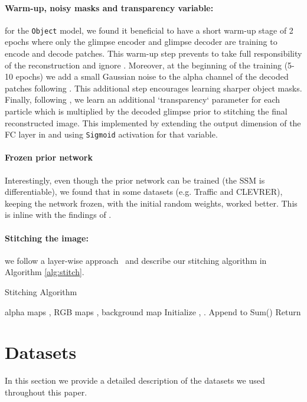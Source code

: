 \documentclass[nohyperref]{article}
\theoremstyle{plain}
\theoremstyle{definition}
\theoremstyle{remark}
\begin{document}
\paragraph{Warm-up, noisy masks and transparency variable:} for the \texttt{Object} model, we found it beneficial to have a short warm-up stage of 2 epochs where only the glimpse encoder and glimpse decoder are training to encode and decode patches. This warm-up step prevents  to take full responsibility of the reconstruction and ignore . Moreover, at the beginning of the training (5-10 epochs) we add a small Gaussian noise  to the alpha channel of the decoded patches following \citet{smirnov2021marionette}. This additional step encourages learning sharper object masks. Finally, following \citet{smirnov2021marionette}, we learn an additional `transparency` parameter for each particle  which is multiplied by the decoded glimpse prior to stitching the final reconstructed image. This implemented by extending the output dimension of the FC layer in  and using \texttt{Sigmoid} activation for that variable.

\paragraph{Frozen prior network} Interestingly, even though the prior network can be trained (the SSM is differentiable), we found that in some datasets (e.g. Traffic and CLEVRER), keeping the network frozen, with the initial random weights, worked better. This is inline with the findings of \citet{frankle2020training}.

\paragraph{Stitching the image:} we follow a layer-wise approach~\citep{smirnov2021marionette} and describe our stitching algorithm in Algorithm \ref{alg:stitch}.

\begin{algorithm}[tb]
  \caption{Stitching Algorithm}
  \label{alg:stitch}
\begin{algorithmic}
   alpha maps ,  RGB maps , background map 
\STATE Initialize , .
  \STATE 
  \STATE 
  \STATE Append  to 
  \STATE 
  \ENDFOR
  \STATE  Sum()
  \STATE 
  \STATE Return 
\end{algorithmic}
\end{algorithm}

\section{Datasets}
\label{apndx:data}
In this section we provide a detailed description of the datasets we used throughout this paper.
\end{document}
